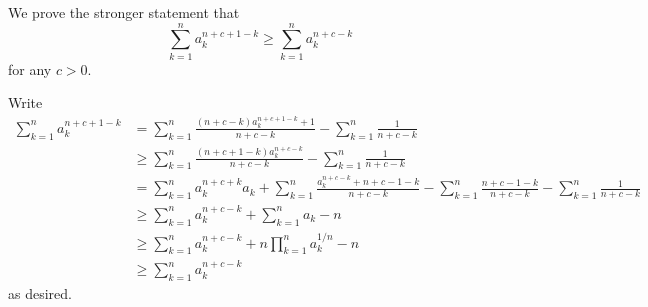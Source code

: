 We prove the stronger statement that \[\sum_{k=1}^na_k^{n+c+1-k}\geq\sum_{k=1}^na_k^{n+c-k}\] for any $c>0$.

Write
\begin{align*}
	\sum_{k=1}^na_k^{n+c+1-k}&=\sum_{k=1}^n\frac{(n+c-k)a_k^{n+c+1-k}+1}{n+c-k}-\sum_{k=1}^n\frac{1}{n+c-k}\\
	&\geq\sum_{k=1}^n\frac{(n+c+1-k)a_k^{n+c-k}}{n+c-k}-\sum_{k=1}^n\frac{1}{n+c-k}\\
	&=\sum_{k=1}^na_k^{n+c+k}a_k+\sum_{k=1}^n\frac{a_k^{n+c-k}+n+c-1-k}{n+c-k}-\sum_{k=1}^n\frac{n+c-1-k}{n+c-k}-\sum_{k=1}^n\frac{1}{n+c-k}\\
	&\geq\sum_{k=1}^na_k^{n+c-k}+\sum_{k=1}^na_k-n\\
	&\geq\sum_{k=1}^na_k^{n+c-k}+n\prod_{k=1}^na_k^{1/n}-n\\
	&\geq\sum_{k=1}^na_k^{n+c-k}
\end{align*}
as desired.